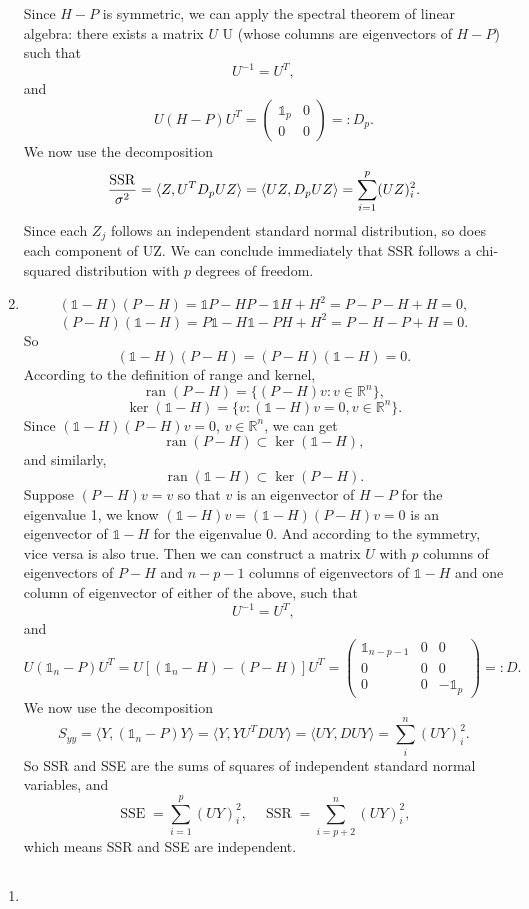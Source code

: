 \documentclass[11pt,a4paper]{article}
\begin{document}
\begin{enumerate}[label=\roman*)]
Since $H-P$ is symmetric, we can apply the spectral theorem of linear algebra: there exists a matrix $U$ U (whose columns are eigenvectors of $H-P$) such that
$$U^{-1}=U^T,$$
and
$$U(H-P)U^T=\begin{pmatrix}
\mathbb{1}_p & 0 \\ 0 & 0
\end{pmatrix}=:D_p.$$
We now use the decomposition
$$\frac{\rm SSR}{\sigma^2}=\langle Z,U^TD_pUZ\rangle=\langle UZ,D_pUZ\rangle=\sum_{i=1}^p(UZ)_i^2.$$
Since each $Z_j$ follows an independent standard normal distribution, so does each component of UZ. We can
conclude immediately that SSR follows a chi-squared distribution with $p$ degrees of freedom.
\item
$$(\mathbb{1}-H)(P-H)=\mathbb{1}P-HP-\mathbb{1}H+H^2=P-P-H+H=0,$$
$$(P-H)(\mathbb{1}-H)=P\mathbb{1}-H\mathbb{1}-PH+H^2=P-H-P+H=0.$$
So $$(\mathbb{1}-H)(P-H)=(P-H)(\mathbb{1}-H)=0.$$
According to the definition of range and kernel,
$$\operatorname{ran}(P-H)=\{(P-H)v:v\in\mathbb{R}^n\},$$
$$\ker(\mathbb{1}-H)=\{v:(\mathbb{1}-H)v=0,v\in\mathbb{R}^n\}.$$
Since $(\mathbb{1}-H)(P-H)v=0$, $v\in\mathbb{R}^n$, we can get $$\operatorname{ran}(P-H)\subset\ker(\mathbb{1}-H),$$
and similarly, $$\operatorname{ran}(\mathbb{1}-H)\subset\ker(P-H).$$
Suppose $(P-H)v=v$ so that $v$ is an eigenvector of $H-P$ for the eigenvalue 1, we know $(\mathbb{1}-H)v=(\mathbb{1}-H)(P-H)v=0$ is an eigenvector of $\mathbb{1}-H$ for the eigenvalue  0. And according to the symmetry, vice versa is also true. Then we can construct a matrix $U$ with $p$ columns of eigenvectors of $P-H$ and $n-p-1$ columns of eigenvectors of $\mathbb{1}-H$ and one column of eigenvector of either of the above,  such that
$$U^{-1}=U^T,$$
and
$$U(\mathbb{1}_n-P)U^T=U[(\mathbb{1}_n-H)-(P-H)]U^T=\begin{pmatrix}
\mathbb{1}_{n-p-1} & 0 & 0 \\ 0 & 0 & 0 \\ 0 & 0 & -\mathbb{1}_p
\end{pmatrix}=:D.$$
We now use the decomposition
$$S_{yy}=\langle Y,(\mathbb{1}_n-P)Y\rangle=\langle Y,YU^TDUY\rangle=\langle UY,DUY\rangle=\sum_i^{n}(UY)_i^2.$$
So SSR and SSE are the sums of squares of independent standard normal variables, and
$$\operatorname{SSE}=\sum_{i=1}^{p}(UY)_i^2,\quad\operatorname{SSR}=\sum_{i=p+2}^{n}(UY)_i^2,$$
which means SSR and SSE are independent.
\end{enumerate}

\subsection{}
\begin{enumerate}[label=\roman*)]
\item
\end{enumerate}
\end{document}
